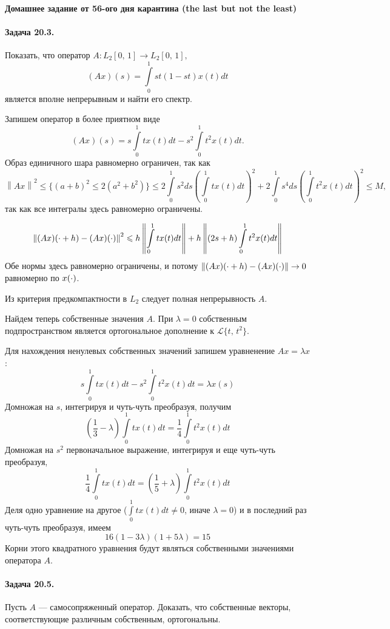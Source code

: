 \documentclass[16pt]{article}
\newenvironment{Sol}{\par\noindent{\it Решение:}}
\newcommand\A{(\cdot)}
\newcommand\Norm[1]{\left\| #1 \right\|}
\newcommand\Int[2]{\int\limits_{#1}^{#2}}
\begin{document}
\paragraph{Домашнее задание от 56-ого дня карантина (the last but not the least)}
\paragraph{Задача 20.3.} Показать, что оператор $A\colon L_2[0,\,1] \to L_2[0,\,1], $
$$(Ax)(s) = \Int{0}{1}st(1-st)x(t)dt$$
является вполне непрерывным и найти его спектр.

\begin{Sol}
Запишем оператор в более приятном виде
$$(Ax)(s) = s\Int{0}{1}tx(t)dt - s^2\Int{0}{1}t^2x(t)dt.$$
Образ единичного шара равномерно ограничен, так как
$$\Norm{Ax}^2 \leqslant \{(a + b)^2 \leqslant 2(a^2 + b^2)\} \leqslant
2\Int{0}{1}s^2ds\left(\Int{0}{1}tx(t)dt\right)^2 + 2\Int{0}{1}s^4ds\left(\Int{0}{1}t^2x(t)dt\right)^2 \leqslant M,$$
так как все интегралы здесь равномерно ограничены.

$$\Norm{(Ax)(\cdot + h) - (Ax)\A}^2 \leqslant h\Norm{\Int{0}{1}tx(t)dt} + h\Norm{(2s+h)\Int{0}{1}t^2x(t)dt}$$
Обе нормы здесь равномерно ограничены, и потому $\Norm{(Ax)(\cdot + h) - (Ax)\A} \to 0$ равномерно по $x\A$.

Из критерия предкомпактности в $L_2$ следует полная непрерывность $A$.

Найдем теперь собственные значения $A$. При $\lambda = 0$ собственным подпространством является ортогональное
дополнение к $\mathscr{L}\{t, \,t^2\}$.

Для нахождения ненулевых собственных значений запишем уравненение $Ax = \lambda x$:
$$s\Int{0}{1}tx(t)dt - s^2\Int{0}{1}t^2x(t)dt = \lambda x(s)$$
Домножая на $s$, интегрируя и чуть-чуть преобразуя, получим
$$\left(\frac13 - \lambda\right)\Int{0}{1}tx(t)dt = \frac{1}{4}\Int{0}{1}t^2 x(t)dt$$
Домножая на $s^2$ первоначальное выражение, интегрируя и еще чуть-чуть преобразуя,
$$\frac14 \Int{0}{1}tx(t)dt = \left(\frac15 + \lambda\right)\Int{0}{1}t^2x(t)dt$$
Деля одно уравнение на другое ($ \Int{0}{1}tx(t)dt \not= 0$, иначе $\lambda = 0$) и в последний раз
чуть-чуть преобразуя, имеем
$$16(1 - 3\lambda)(1 + 5\lambda) = 15$$
Корни этого квадратного уравнения будут являться собственными значениями оператора $A$.
\end{Sol} 

\newpage
\paragraph{Задача 20.5.} Пусть $A$ --- самосопряженный оператор. Доказать, что собственные векторы, соответствующие
различным собственным, ортогональны.
\end{document}
